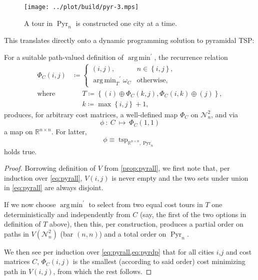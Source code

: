 \documentclass[index=totoc,bibliography=totoc]{scrartcl}
\newcommand{\annotation}[1]{\marginpar{\small\itshape\color{green}#1}}
\DeclareMathOperator*{\argmin}{arg\,min}
\numberwithin{equation}{section}
\numberwithin{figure}{section}
\numberwithin{table}{section}
\begin{document}
\begin{figure}[hbt]
  \centering
  \texttt{[image: ../plot/build/pyr-3.mps]}
  \label{fig:pyrpart}
  \caption{A tour in $\operatorname{Pyr}_n$ is constructed one city at a time.}
\end{figure}

This translates directly onto a dynamic programming solution to pyramidal TSP:
\begin{corollary}
\label{cor:pyrdp}
  For a suitable path-valued definition of $\argmin^\prime$, the recurrence relation
  \begin{align}
    \label{eq:pyrdp}
    \Phi_C\left(i,j\right) & \coloneqq
    \begin{cases}
      \left(i,j\right), & n \in \left\{i,j\right\}, \\
      {\displaystyle \argmin_T}^\prime \omega_C & \text{otherwise},
    \end{cases}
    \\
    \text{where} & \phantom{\coloneqq}
    T \coloneqq
    \left\{
    \left(i\right) \oplus \Phi_C\left(k,j\right),
    \Phi_C\left(i,k\right) \oplus \left(j\right)
    \right\},
    \nonumber
    \\
    & \phantom{\coloneqq}
    k \coloneqq \max\left\{i,j\right\}+1,
    \nonumber
  \end{align}
  produces, for arbitrary cost matrices, a well-defined map $\Phi_C$ on $\mathcal{N}_n^2$,
  and via
  \[
    \phi~:~C~\mapsto~\Phi_C\left(1,1\right)
  \]
  a map on $\mathbb{R}^{n \times n}$.
  For latter,
  \[
    \phi \equiv \operatorname{tsp}_{\mathbb{R}^{n \times n},\operatorname{Pyr}_n}
  \]
  holds true.
\end{corollary}
\begin{proof}
  Borrowing definition of $V$ from \cref{prop:pyrall}, we first note that,
  per induction over \eqref{eq:pyrall}, $V\left(i,j\right)$ is never empty
  and the two sets under union in \cref{eq:pyrall} are always disjoint.

  If we now choose $\argmin^\prime$ to select from two equal cost tours in
  $T$ one deterministically and independently from $C$ (say, the first of
  the two options in definition of $T$ above), then this, per construction,
  produces a partial order on paths in $V\left(\mathcal{N}_n^2\right)$ (bar
  $(n,n)$) and a total order on $\operatorname{Pyr}_n$.

  We then see per induction over \cref{eq:pyrall,eq:pyrdp} that for all
  cities $i$,$j$ and cost matrices $C$, $\Phi_C\left(i,j\right)$ is the
  smallest (according to said order) cost minimizing path in $V\left(i,j\right)$,
  from which the rest follows.
\end{proof}
\end{document}
